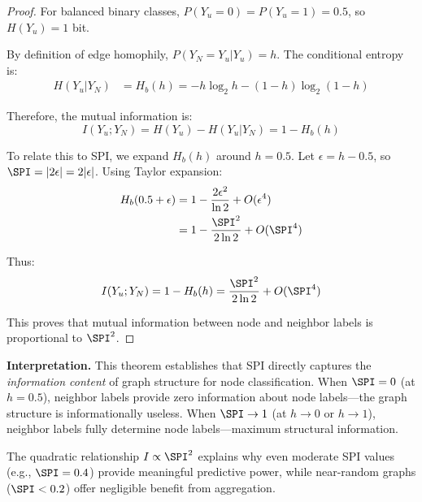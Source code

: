 \begin{proof}
For balanced binary classes, $P(Y_u = 0) = P(Y_u = 1) = 0.5$, so $H(Y_u) = 1$ bit.

By definition of edge homophily, $P(Y_N = Y_u | Y_u) = h$. The conditional entropy is:
\begin{align}
H(Y_u | Y_N) &= H_b(h) = -h\log_2 h - (1-h)\log_2(1-h)
\end{align}

Therefore, the mutual information is:
\begin{equation}
I(Y_u; Y_N) = H(Y_u) - H(Y_u | Y_N) = 1 - H_b(h)
\end{equation}

To relate this to SPI, we expand $H_b(h)$ around $h = 0.5$. Let $\epsilon = h - 0.5$, so $\SPI = |2\epsilon| = 2|\epsilon|$. Using Taylor expansion:
\begin{align}
H_b(0.5 + \epsilon) &= 1 - \frac{2\epsilon^2}{\ln 2} + O(\epsilon^4) \\
&= 1 - \frac{\SPI^2}{2\ln 2} + O(\SPI^4)
\end{align}

Thus:
\begin{equation}
I(Y_u; Y_N) = 1 - H_b(h) = \frac{\SPI^2}{2\ln 2} + O(\SPI^4)
\end{equation}

This proves that mutual information between node and neighbor labels is proportional to $\SPI^2$.
\end{proof}

\textbf{Interpretation.} This theorem establishes that SPI directly captures the \textit{information content} of graph structure for node classification. When $\SPI = 0$ (at $h = 0.5$), neighbor labels provide zero information about node labels---the graph structure is informationally useless. When $\SPI \to 1$ (at $h \to 0$ or $h \to 1$), neighbor labels fully determine node labels---maximum structural information.

The quadratic relationship $I \propto \SPI^2$ explains why even moderate SPI values (e.g., $\SPI = 0.4$) provide meaningful predictive power, while near-random graphs ($\SPI < 0.2$) offer negligible benefit from aggregation.
